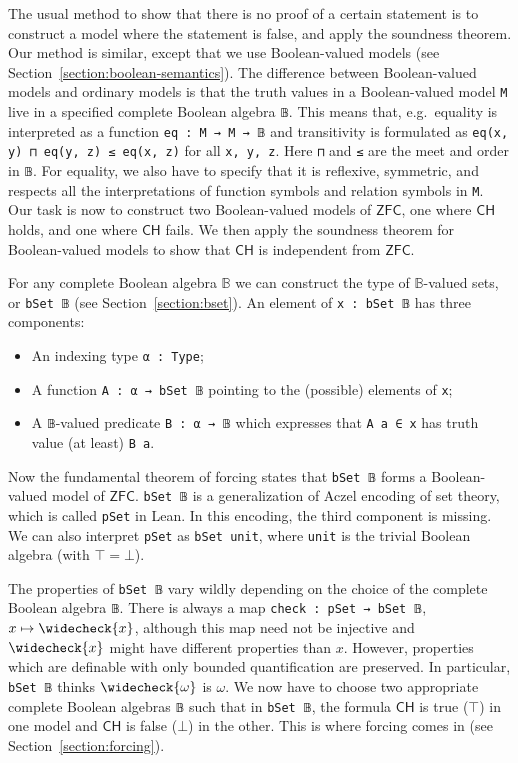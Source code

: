 \documentclass[sigplan,10pt,review, autoref,anonymous]{acmart}
\newcommand{\lil}{\lstinline}
\newcommand{\ZFC}{\mathsf{ZFC}}
\newcommand{\CH}{\mathsf{CH}}
\theoremstyle{definition}
\begin{document}
The usual method to show that there is no proof of a certain statement is to construct a model where the statement is false, and apply the soundness theorem.
Our method is similar, except that we use Boolean-valued models (see Section~\autoref{section:boolean-semantics}).
The difference between Boolean-valued models and ordinary models is that the truth values in a Boolean-valued model \lil{M} live in a specified complete Boolean algebra \lil{𝔹}.
This means that, e.g.\ equality is interpreted as a function \lil{eq : M → M → 𝔹} and transitivity is formulated as \lil{eq(x, y) ⊓ eq(y, z) ≤ eq(x, z)} for all \lil{x, y, z}.
Here \lil{⊓} and \lil{≤} are the meet and order in \lil{𝔹}.
For equality, we also have to specify that it is reflexive, symmetric, and respects all the interpretations of function symbols and relation symbols in \lil{M}.
Our task is now to construct two Boolean-valued models of $\ZFC$, one where $\CH$ holds, and one where $\CH$ fails.
We then apply the soundness theorem for Boolean-valued models to show that $\CH$ is independent from $\ZFC$.

For any complete Boolean algebra $\mathbb{B}$ we can construct the type of $\mathbb{B}$-valued sets, or \lil{bSet 𝔹} (see Section~\autoref{section:bset}).
An element of \lil{x : bSet 𝔹} has three components:
\begin{itemize}
\item An indexing type \lil{α : Type};
\item A function \lil{A : α → bSet 𝔹} pointing to the (possible) elements of \lil{x};
\item A \lil{𝔹}-valued predicate \lil{B : α → 𝔹} which expresses that \lil{A a ∈ x} has truth value (at least) \lil{B a}.
\end{itemize}
Now the fundamental theorem of forcing states that \lil{bSet 𝔹} forms a Boolean-valued model of $\ZFC$.
\lil{bSet 𝔹} is a generalization of Aczel encoding of set theory, which is called \lil{pSet} in Lean.
In this encoding, the third component is missing.
We can also interpret \lil{pSet} as \lil{bSet unit}, where \lil{unit} is the trivial Boolean algebra (with $\top=\bot$).

The properties of \lil{bSet 𝔹} vary wildly depending on the choice of the complete Boolean algebra \lil{𝔹}.
There is always a map \lil{check : pSet → bSet 𝔹}, $x \mapsto \widecheck{x}$, although this map need not be injective and $\widecheck{x}$ might have different properties than $x$. However, properties which are definable with only bounded quantification are preserved. In particular, \lil{bSet 𝔹} thinks $\widecheck{\omega}$ is $\omega$.
We now have to choose two appropriate complete Boolean algebras \lil{𝔹} such that in \lil{bSet 𝔹}, the formula $\CH$ is true ($\top$) in one model and $\CH$ is false ($\bot$) in the other.
This is where forcing comes in (see Section~\autoref{section:forcing}).
\end{document}
